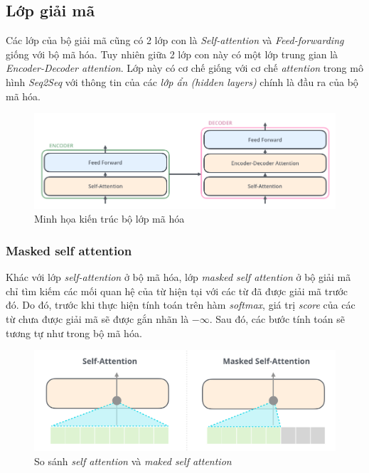 \subsection{Lớp giải mã}
Các lớp của bộ giải mã cũng có 2 lớp con là \textit{Self-attention} và \textit{Feed-forwarding} giống với bộ mã hóa. Tuy nhiên giữa 2 lớp con này có một lớp trung gian là \textit{Encoder-Decoder attention}. Lớp này có cơ chế giống với cơ chế \textit{attention} trong mô hình \textit{Seq2Seq} với thông tin của các \textit{lớp ẩn (hidden layers)} chính là đầu ra của bộ mã hóa.

\begin{figure}[H]
    \begin{center}
        \includegraphics[scale=0.5]{images/transformer_decoder}
        \caption{Minh họa kiến trúc bộ lớp mã hóa \cite{illustrated.transformer}}
        \label{fig:decoder}
    \end{center}
\end{figure}

\subsubsection{Masked self attention}

Khác với lớp \textit{self-attention} ở bộ mã hóa, lớp \textit{masked self attention} ở bộ giải mã chỉ tìm kiếm các mối quan hệ của từ hiện tại với các từ đã được giải mã trước đó. Do đó, trước khi thực hiện tính toán trên hàm \textit{softmax}, giá trị \textit{score} của các từ chưa được giải mã sẽ được gắn nhãn là $-\infty$. Sau đó, các bước tính toán sẽ tương tự như trong bộ mã hóa.

\begin{figure}[H]
    \begin{center}
        \includegraphics[scale=0.3]{images/self-attention-and-masked-self-attention}
        \caption{So sánh \textit{self attention} và \textit{maked self attention}}
        \label{fig:masked-self-attention}
    \end{center}
\end{figure}

